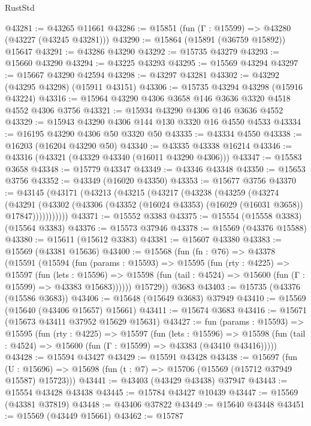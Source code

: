 \begin{lexlean}{RustStd}
\begin{coremodule}
@43281 := @43265 @11661
@43286 := @15851 (fun (Γ : @15599) => @43280 (@43227 (@43245 @43281)))
@43290 := @15864 (@15891 (@36759 @15892)) @15647
@43291 := @43286 @43290
@43292 := @15735 @43279
@43293 := @15660 @43290
@43294 := @43225 @43293
@43295 := @15569 @43294
@43297 := @15667 @43290 @42594
@43298 := @43297 @43281
@43302 := @43292 (@43295 @43298) (@15911 @43151)
@43306 := @15735 @43294 @43298 (@15916 @43224)
@43316 := @15964 @43290 @4306 @3658 @146 @3636 @3320 @4518 @4552 @4306 @3756
@43321 := @15934 @43290 @4306 @146 @3636 @4552
@43329 := @15943 @43290 @4306 @144 @130 @3320 @16 @4550 @4533
@43334 := @16195 @43290 @4306 @50 @3320 @50
@43335 := @43334 @4550
@43338 := @16203 (@16204 @43290 @50)
@43340 := @43335 @43338 @16214
@43346 := @43316 (@43321 (@43329 @43340 (@16011 @43290 @4306)))
@43347 := @15583 @3658
@43348 := @15779 @43347
@43349 := @43346 @43348
@43350 := @15653 @3756
@43352 := @43349 (@16020 @43350)
@43353 := @15677 @3756
@43370 := @43145
    (@43171
      (@43213
        (@43215
          (@43217
            (@43238
              (@43259
                (@43274
                  (@43291
                    (@43302
                      (@43306 (@43352 (@16024 @43353) (@16029 (@16031 @3658)) @17847)))))))))))
@43371 := @15552 @3383
@43375 := @15554 (@15558 @3383) (@15564 @3383)
@43376 := @15573 @37946
@43378 := @15569 (@43376 @15588)
@43380 := @15611 (@15612 @3383)
@43381 := @15607 @43380
@43383 := @15569 (@43381 @15636)
@43400 := @15568
    (fun (fn : @76) =>
    @43378
      (@15591
        (@15594
          (fun (params : @15593) =>
          @15595
            (fun (rty : @4225) =>
            @15597
              (fun (lets : @15596) =>
              @15598 (fun (tail : @4524) => @15600 (fun (Γ : @15599) => @43383 @15683))))))
        @15729))
    @3683
@43403 := @15735 (@43376 (@15586 @3683))
@43406 := @15648 (@15649 @3683) @37949
@43410 := @15569 (@15640 (@43406 @15657) @15661)
@43411 := @15674 @3683
@43416 := @15671 (@15673 @43411 @37952 @15629 @15631)
@43427 := fun (params : @15593) =>
  @15595
    (fun (rty : @4225) =>
    @15597
      (fun (lets : @15596) =>
      @15598 (fun (tail : @4524) => @15600 (fun (Γ : @15599) => @43383 (@43410 @43416)))))
@43428 := @15594 @43427
@43429 := @15591 @43428
@43438 := @15697
    (fun (U : @15696) => @15698 (fun (t : @7) => @15706 (@15569 (@15712 @37949 @15587) @15723)))
@43441 := @43403 (@43429 @43438) @37947
@43443 := @15554 @43428 @43438
@43445 := @15784 @43427 @10439
@43447 := @15569 (@43381 @37819)
@43448 := @43406 @37822
@43449 := @15640 @43448
@43451 := @15569 (@43449 @15661)
@43462 := @15787

\end{coremodule}
\end{lexlean}
